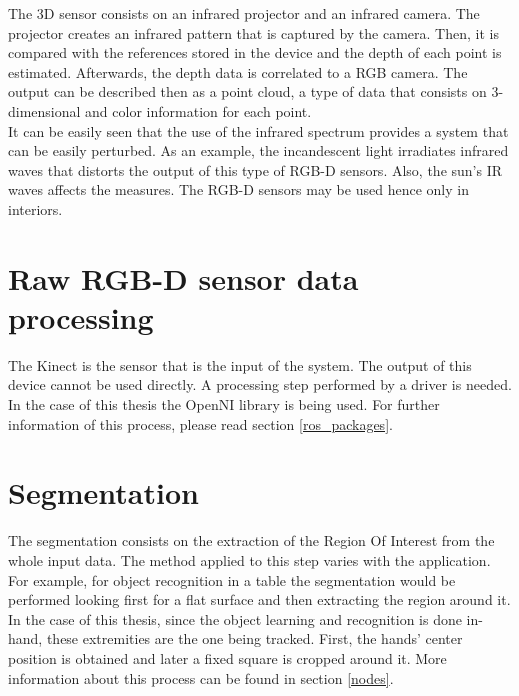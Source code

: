\label{rgb-d}

The 3D sensor consists on an infrared projector and an infrared camera. 
The projector creates an infrared pattern that is captured by the camera.
Then, it is compared with the references stored in the device and the depth of each point is estimated. 
Afterwards, the depth data is correlated to a RGB camera. 
The output can be described then as a point cloud, a type of data that consists on 3-dimensional and color information for each point.  
\\

It can be easily seen that the use of the infrared spectrum provides a system that can be easily perturbed. 
As an example, the incandescent light irradiates infrared waves that distorts the output of this type of RGB-D sensors. 
Also, the sun's IR waves affects the measures. 
The RGB-D sensors may be used hence only in interiors. 




\section{Raw RGB-D sensor data processing}
\label{input_data}
The Kinect is the sensor that is the input of the system. 
The output of this device cannot be used directly. 
A processing step performed by a driver is needed. 
In the case of this thesis the OpenNI library is being used. 
For further information of this process, please read section \ref{ros_packages}.


\section{Segmentation}
\label{segmentation}
The segmentation consists on the extraction of the Region Of Interest from the whole input data. 
The method applied to this step varies with the application. 
For example, for object recognition in a table the segmentation would be performed looking first for a flat surface and then extracting the region around it. 
In the case of this thesis, since the object learning and recognition is done in-hand, these extremities are the one being tracked. 
First, the hands' center position is obtained and later a fixed square is cropped around it. 
More information about this process can be found in section \ref{nodes}.



